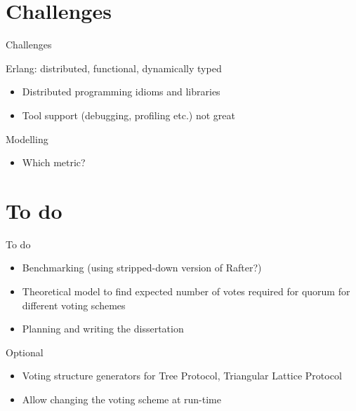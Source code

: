 \documentclass{beamer}
\begin{document}
\section{Challenges}
\begin{frame}{Challenges}
    \begin{block}{Erlang: distributed, functional, dynamically typed}
        \begin{itemize}
            \item Distributed programming idioms and libraries
            \item Tool support (debugging, profiling etc.) not great
        \end{itemize}
    \end{block}
    \begin{block}{Modelling}
        \begin{itemize}
            \item Which metric?
        \end{itemize}
    \end{block}
\end{frame}

\section{To do}
\begin{frame}{To do}
    \begin{itemize}
        \item Benchmarking (using stripped-down version of Rafter?)
        \item Theoretical model to find expected number of votes required for quorum for different voting schemes
        \item Planning and writing the dissertation
    \end{itemize}
    \begin{block}{Optional}
        \begin{itemize}
            \item Voting structure generators for Tree Protocol, Triangular Lattice Protocol
            \item Allow changing the voting scheme at run-time %
        \end{itemize}
    \end{block}
\end{frame}
\end{document}
